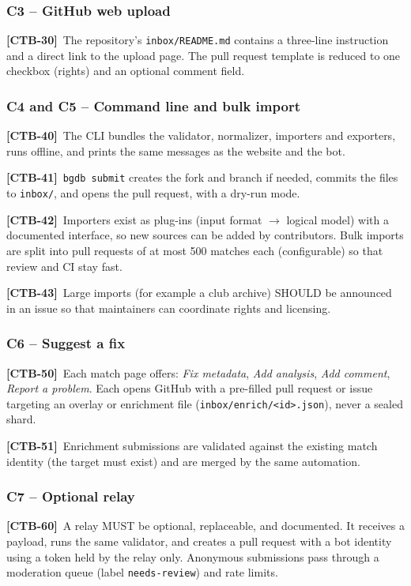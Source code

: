 \documentclass[11pt,a4paper]{article}
\newcommand{\req}[2]{\par\smallskip\noindent\hypertarget{#1}{}\textbf{[#1]}\ #2\par}
\begin{document}
\subsubsection*{C3 -- GitHub web upload}
\req{CTB-30}{The repository's \texttt{inbox/README.md} contains a three-line instruction and a direct link to the upload page. The pull request template is reduced to one checkbox (rights) and an optional comment field.}

\subsubsection*{C4 and C5 -- Command line and bulk import}
\req{CTB-40}{The CLI bundles the validator, normalizer, importers and exporters, runs offline, and prints the same messages as the website and the bot.}
\req{CTB-41}{\texttt{bgdb submit} creates the fork and branch if needed, commits the files to \texttt{inbox/}, and opens the pull request, with a dry-run mode.}
\req{CTB-42}{Importers exist as plug-ins (input format $\rightarrow$ logical model) with a documented interface, so new sources can be added by contributors. Bulk imports are split into pull requests of at most 500 matches each (configurable) so that review and CI stay fast.}
\req{CTB-43}{Large imports (for example a club archive) SHOULD be announced in an issue so that maintainers can coordinate rights and licensing.}

\subsubsection*{C6 -- Suggest a fix}\label{sec:enrichment}
\req{CTB-50}{Each match page offers: \emph{Fix metadata}, \emph{Add analysis}, \emph{Add comment}, \emph{Report a problem}. Each opens GitHub with a pre-filled pull request or issue targeting an overlay or enrichment file (\texttt{inbox/enrich/<id>.json}), never a sealed shard.}
\req{CTB-51}{Enrichment submissions are validated against the existing match identity (the target must exist) and are merged by the same automation.}

\subsubsection*{C7 -- Optional relay}
\req{CTB-60}{A relay MUST be optional, replaceable, and documented. It receives a payload, runs the same validator, and creates a pull request with a bot identity using a token held by the relay only. Anonymous submissions pass through a moderation queue (label \texttt{needs-review}) and rate limits.}
\end{document}
